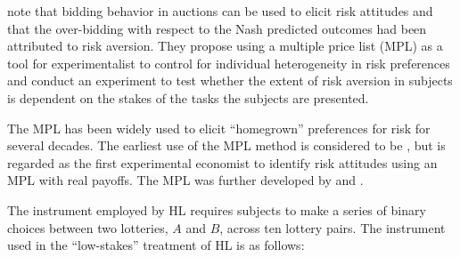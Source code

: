 \documentclass[11pt,a4paper]{report}
\begin{document}
\textcite[1644]{Holt2002} note that bidding behavior in auctions can be used to elicit risk attitudes and that the over-bidding with respect to the Nash predicted outcomes had been attributed to risk aversion.
They propose using a multiple price list (MPL) as a tool for experimentalist to control for individual heterogeneity in risk preferences and conduct an experiment to test whether the extent of risk aversion in subjects is dependent on the stakes of the tasks the subjects are presented.

 
The MPL has been widely used to elicit \enquote{homegrown} preferences for risk for several decades.
The earliest use of the MPL method is considered to be \textcite{Miller1969}, but \textcite{Binswanger1980, Binswanger1981} is regarded as the first experimental economist to identify risk attitudes using an MPL with real payoffs.
The MPL was further developed by \textcite{Schubert1999} and \textcite{Holt2002}.

The instrument employed by HL requires subjects to make a series of binary choices between two lotteries, $A$ and $B$, across ten lottery pairs.
The instrument used in the \enquote{low-stakes} treatment of HL is as follows:
\end{document}
